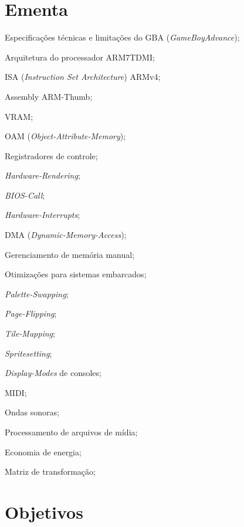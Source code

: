 \documentclass{article}
\begin{document}
\section{Ementa}
\begin{itemize*}[label={}]
    \item Especificações técnicas e limitações do GBA (\textit{GameBoyAdvance});
    \item Arquitetura do processador ARM7TDMI\@;
    \item ISA (\textit{Instruction Set Architecture}) ARMv4;
    \item Assembly ARM-Thumb;
    \item VRAM\@;
    \item OAM (\textit{Object-Attribute-Memory});
    \item Registradores de controle;
    \item \textit{Hardware-Rendering};
    \item \textit{BIOS-Call};
    \item \textit{Hardware-Interrupts};
    \item DMA (\textit{Dynamic-Memory-Access});
    \item Gerenciamento de memória manual;
    \item Otimizações para sistemas embarcados;
    \item \textit{Palette-Swapping};
    \item \textit{Page-Flipping};
    \item \textit{Tile-Mapping};
    \item \textit{Spritesetting};
    \item \textit{Display-Modes} de consoles;
    \item MIDI\@;
    \item Ondas sonoras;
    \item Processamento de arquivos de mídia;
    \item Economia de energia;
    \item Matriz de transformação;
\end{itemize*}

\section{Objetivos}
\end{document}
